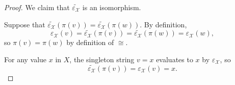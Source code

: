 \begin{proof}
  We claim that \( \widetilde{\varepsilon_\mscrX} \) is an isomorphism.

   Suppose that \( \widetilde{\varepsilon_\mscrX}(\pi(v)) = \widetilde{\varepsilon_\mscrX}(\pi(w)) \). By definition,
  \begin{equation*}
    \varepsilon_\mscrX(v) = \widetilde{\varepsilon_\mscrX}(\pi(v)) = \widetilde{\varepsilon_\mscrX}(\pi(w)) = \varepsilon_\mscrX(w),
  \end{equation*}
  so \( \pi(v) = \pi(w) \) by definition of \( {\cong} \).

   For any value \( x \) in \( X \), the singleton string \( v = x \) evaluates to \( x \) by \( \varepsilon_\mscrX \), so
  \begin{equation*}
    \widetilde{\varepsilon_\mscrX}(\pi(v)) = \varepsilon_\mscrX(v) = x.
  \end{equation*}
\end{proof}


